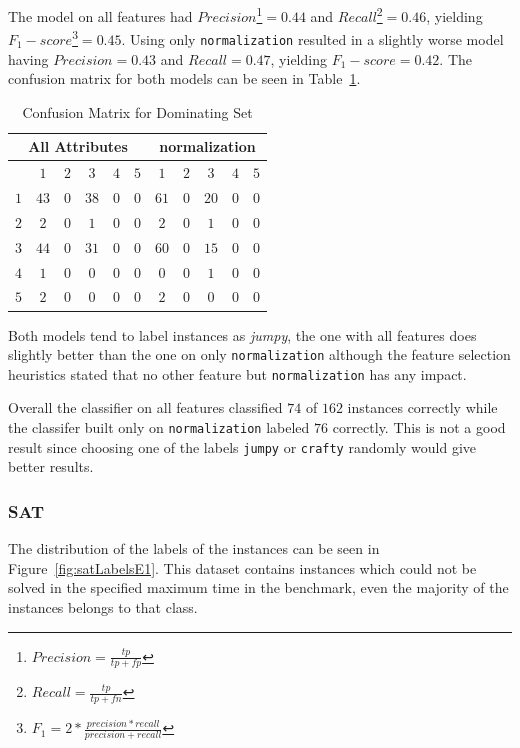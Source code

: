 \par The model on all features had $Precision$\footnote{$Precision=\frac{tp}{tp+fp}$}$=0.44$ and $Recall$\footnote{$Recall=\frac{tp}{tp+fn}$}$=0.46$, yielding $F_1-score$\footnote{$F_1=2*\frac{precision*recall}{precision+recall}$}$=0.45$.
Using only \lstinline$normalization$ resulted in a slightly worse model having $Precision=0.43$ and $Recall=0.47$, yielding $F_1-score=0.42$. The confusion matrix for both models can be seen in Table~\ref{tbl:dsCME1}. 
\begin{table}[h]
\center
	\begin{tabular}{|c|ccccc|ccccc|}
		\hline
		\multicolumn{6}{|c|}{All Attributes} &\multicolumn{5}{|c|}{normalization}\\
		\hline &$1$&$2$&$3$&$4$&$5$&$1$&$2$&$3$&$4$&$5$\\
		 \hline$1$ & $43$ & $0$ & $38$ & $0$ & $0$ & $61$ & $0$ & $20$ & $0$ & $0$\\
		 $2$ & $2$ & $0$ & $1$ & $0$ & $0$ & $2$ & $0$ & $1$ & $0$ & $0$\\
		 $3$ & $44$ & $0$ & $31$ & $0$ & $0$ & $60$ & $0$& $15$ & $0$ &$0$\\
		 $4$ & $1$ & $0$ & $0$ & $0$ & $0$ &$0$ &$0$&$1$&$0$&$0$\\
		 $5$ & $2$ & $0$& $0$ &$0$&$0$&$2$ &$0$&$0$&$0$&$0$\\
		 \hline
	\end{tabular}
	\caption{Confusion Matrix for Dominating Set}
	\label{tbl:dsCME1}
\end{table}

Both models tend to label instances as \emph{jumpy}, the one with all features does slightly better than the one on only \lstinline$normalization$ although the feature selection heuristics stated that no other feature but \lstinline$normalization$ has any impact.

Overall the classifier on all features classified $74$ of $162$ instances correctly while the classifer built only on \lstinline$normalization$ labeled $76$ correctly. This is not a good result since choosing one of the labels \lstinline$jumpy$ or \lstinline$crafty$ randomly would give better results.

\subsubsection{SAT}
The distribution of the labels of the instances can be seen in Figure~\ref{fig:satLabelsE1}. This dataset contains instances which could not be solved in the specified maximum time in the benchmark, even the majority of the instances belongs to that class. 


